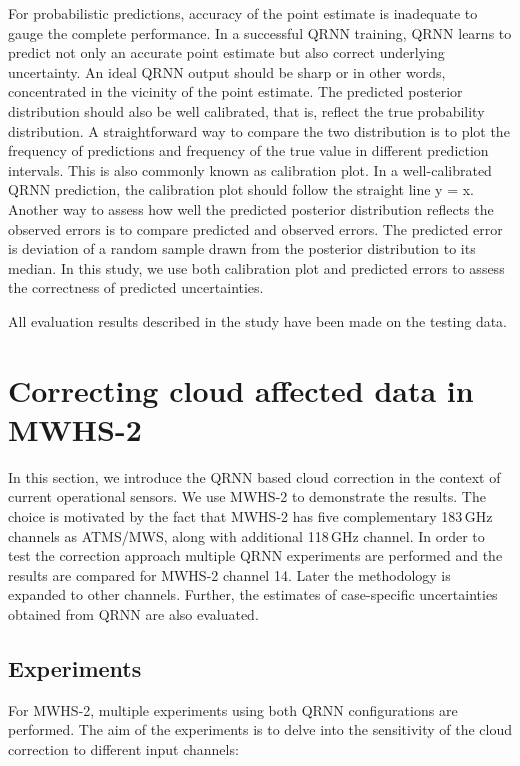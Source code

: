 \documentclass[amt, manuscript]{copernicus}
\begin{document}
For probabilistic predictions, accuracy of the point estimate is inadequate to gauge the complete performance. In a successful QRNN training, QRNN learns to predict not only an accurate point estimate but also correct underlying uncertainty. An ideal QRNN output should be sharp or in other words, concentrated in the vicinity of the point estimate. The predicted posterior distribution should also be well calibrated, that is, reflect the true probability distribution. A straightforward way to compare the two distribution is to plot the frequency of predictions and frequency of the true value in different prediction intervals. This is also commonly known as calibration plot. In a well-calibrated QRNN prediction, the calibration plot should follow the straight line y = x. Another way to assess how well the predicted posterior distribution reflects the observed errors is to compare predicted and observed errors. The predicted error is deviation of a random sample drawn from the posterior distribution to its median. In this study, we use both calibration plot and predicted errors to assess the correctness of predicted uncertainties.  

All evaluation results described in the study have been made on the testing data.


\section{Correcting cloud affected data in MWHS-2}
%
In this section, we introduce the QRNN based cloud  correction in the context of current operational sensors.  We use MWHS-2 to demonstrate the results. The choice is motivated by the fact that MWHS-2 has five complementary 183\,GHz channels as ATMS/MWS, along with additional 118\,GHz channel. In order to test the correction approach multiple QRNN experiments are performed and the results are compared for MWHS-2 channel 14. Later the methodology is expanded to other channels.  Further, the estimates of case-specific uncertainties obtained from QRNN are also evaluated.

\subsection{Experiments}
%
For MWHS-2, multiple experiments using both QRNN configurations are performed. The aim of the experiments is to delve into the sensitivity of the cloud correction to different input channels:
\end{document}
